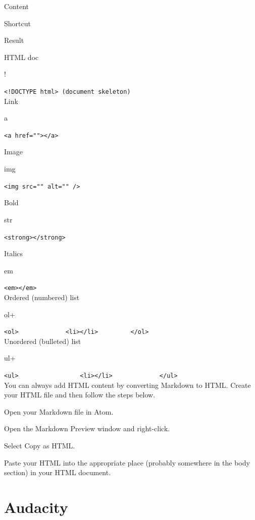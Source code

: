 \documentclass[]{book}
\theoremstyle{definition}
\theoremstyle{definition}
\theoremstyle{definition}
\theoremstyle{remark}
\begin{document}
Content

Shortcut

Result

HTML doc

!

\texttt{\textless{}!DOCTYPE\ html\textgreater{}\ (document\ skeleton)}\\

Link

a

\texttt{\textless{}a\ href=""\textgreater{}\textless{}/a\textgreater{}}

Image

img

\texttt{\textless{}img\ src=""\ alt=""\ /\textgreater{}}

Bold

str

\texttt{\textless{}strong\textgreater{}\textless{}/strong\textgreater{}}

Italics

em

\texttt{\textless{}em\textgreater{}\textless{}/em\textgreater{}}\\

Ordered (numbered) list

ol+

\texttt{\textless{}ol\textgreater{}\ \ \ \ \ \ \ \ \ \ \ \ \ \textless{}li\textgreater{}\textless{}/li\textgreater{}\ \ \ \ \ \ \ \ \ \textless{}/ol\textgreater{}}\\

Unordered (bulleted) list

ul+

\texttt{\textless{}ul\textgreater{}\ \ \ \ \ \ \ \ \ \ \ \ \ \ \ \ \ \textless{}li\textgreater{}\textless{}/li\textgreater{}\ \ \ \ \ \ \ \ \ \ \ \ \ \textless{}/ul\textgreater{}}\\

You can always add HTML content by converting Markdown to HTML. Create
your HTML file and then follow the steps below.

Open your Markdown file in Atom.

Open the Markdown Preview window and right-click.

Select Copy as HTML.

Paste your HTML into the appropriate place (probably somewhere in the
body section) in your HTML document.

\hypertarget{audacity}{%
\chapter{Audacity}\label{audacity}}
\end{document}
